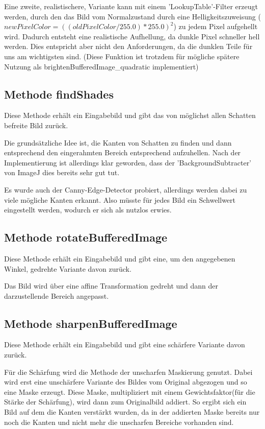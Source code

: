 Eine zweite, realistischere, Variante kann mit einem 'LookupTable'-Filter erzeugt werden, durch den das Bild vom Normalzustand durch eine Helligkeitszuweisung ($newPixelColor = ((oldPixelColor/255.0) * 255.0)^2$) zu jedem Pixel aufgehellt wird.
Dadurch entsteht eine realistische Aufhellung, da dunkle Pixel schneller hell werden. Dies entspricht aber nicht den Anforderungen, da die dunklen Teile für uns am wichtigsten sind. (Diese Funktion ist trotzdem für mögliche spätere Nutzung als brightenBufferedImage\_quadratic implementiert)


\subsection*{Methode findShades}
Diese Methode erhält ein Eingabebild und gibt das von möglichst allen Schatten befreite Bild zurück.

Die grundsätzliche Idee ist, die Kanten von Schatten zu finden und dann entsprechend den eingerahmten Bereich entsprechend aufzuhellen.
Nach der Implementierung ist allerdings klar geworden, dass der 'BackgroundSubtracter' von ImageJ dies bereits sehr gut tut.

Es wurde auch der Canny-Edge-Detector probiert, allerdings werden dabei zu viele mögliche Kanten erkannt. Also müsste für jedes Bild ein Schwellwert eingestellt werden, wodurch er sich als nutzlos erwies.


%


\subsection*{Methode rotateBufferedImage}
Diese Methode erhält ein Eingabebild und gibt eine, um den angegebenen Winkel, gedrehte Variante davon zurück.

Das Bild wird über eine affine Transformation gedreht und dann der darzustellende Bereich angepasst.


\subsection*{Methode sharpenBufferedImage}
Diese Methode erhält ein Eingabebild und gibt eine schärfere Variante davon zurück.

Für die Schärfung wird die Methode der unscharfen Maskierung genutzt. Dabei wird erst eine unschärfere Variante des Bildes vom Original abgezogen und so eine Maske erzeugt. Diese Maske, multipliziert mit einem Gewichtsfaktor(für die Stärke der Schärfung), wird dann zum Originalbild addiert. So ergibt sich ein Bild auf dem die Kanten verstärkt wurden, da in der addierten Maske bereits nur noch die Kanten und nicht mehr die unscharfen Bereiche vorhanden sind.